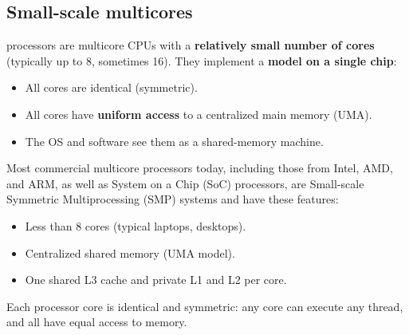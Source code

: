 \subsection{Small-scale multicores}

 processors are multicore CPUs with a \textbf{relatively small number of cores} (typically up to 8, sometimes 16). They implement a  \textbf{model on a single chip}:
\begin{itemize}
    \item All cores are identical (symmetric).
    \item All cores have \textbf{uniform access} to a centralized main memory (UMA).
    \item The OS and software see them as a shared-memory machine.
\end{itemize}
Most commercial multicore processors today, including those from Intel, AMD, and ARM, as well as System on a Chip (SoC) processors, are Small-scale Symmetric Multiprocessing (SMP) systems and have these features:
\begin{itemize}
    \item Less than 8 cores (typical laptops, desktops).
    \item Centralized shared memory (UMA model).
    \item One shared L3 cache and private L1 and L2 per core.
\end{itemize}
Each processor core is identical and symmetric: any core can execute any thread, and all have equal access to memory.

